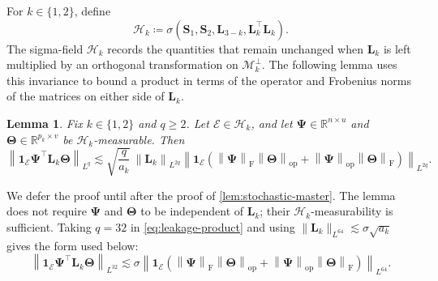 \documentclass[11pt]{article}
\newtheorem{lemma}{Lemma}
\newcommand{\ind}{\bm{1}}
\newcommand{\trans}{\top}
\newcommand{\opn}[1]{\left\lVert #1\right\rVert_{\mathrm{op}}}
\newcommand{\frn}[1]{\left\lVert #1\right\rVert_{\mathrm{F}}}
\newcommand{\Lqn}[2]{\left\lVert #1\right\rVert_{L^{#2}}}
\newcommand{\cM}{\mathcal{M}}
\newcommand{\cE}{\mathcal{E}}
\newcommand{\Hc}{\mathcal{H}}
\begin{document}
For $k\in\{1,2\}$, define
\begin{equation}
\label{eq:Hk-app}
  \Hc_k
  \coloneqq
  \sigma\left(
    \bm S_1,\bm S_2,\bm L_{3-k},\bm L_k^\trans\bm L_k
  \right).
\end{equation}
The sigma-field $\Hc_k$ records the quantities that remain unchanged when
$\bm L_k$ is left multiplied by an orthogonal transformation on
$\cM_k^\perp$. The following lemma uses this invariance to bound a product
in terms of the operator and Frobenius norms of the matrices on either side
of $\bm L_k$.

\begin{lemma}
\label{lem:leakage-product}
Fix $k\in\{1,2\}$ and $q\ge2$. Let $\cE\in\Hc_k$, and let
$\bm\Psi\in\mathbb R^{n\times u}$ and
$\bm\Theta\in\mathbb R^{p_k\times v}$ be $\Hc_k$-measurable. Then
\begin{equation}
\label{eq:leakage-product}
  \Lqn{
    \ind_{\cE}\bm\Psi^\trans\bm L_k\bm\Theta
  }{q}
  \lesssim
  \sqrt{\frac q{a_k}}\,
  \Lqn{\bm L_k}{2q}
  \Lqn{
    \ind_{\cE}
    \left(
      \frn{\bm\Psi}\opn{\bm\Theta}
      +
      \opn{\bm\Psi}\frn{\bm\Theta}
    \right)
  }{2q}.
\end{equation}
\end{lemma}

We defer the proof until after the proof of
\cref{lem:stochastic-master}. The lemma does not require
$\bm\Psi$ and $\bm\Theta$ to be independent of $\bm L_k$; their
$\Hc_k$-measurability is sufficient. Taking $q=32$ in
\cref{eq:leakage-product} and using
$\|\bm L_k\|_{L^{64}}\lesssim\sigma\sqrt{a_k}$ gives the form used below:
\begin{equation}
\label{eq:leakage-product-32}
  \Lqn{
    \ind_{\cE}\bm\Psi^\trans\bm L_k\bm\Theta
  }{32}
  \lesssim
  \sigma
  \Lqn{
    \ind_{\cE}
    \left(
      \frn{\bm\Psi}\opn{\bm\Theta}
      +
      \opn{\bm\Psi}\frn{\bm\Theta}
    \right)
  }{64}.
\end{equation}
\end{document}
